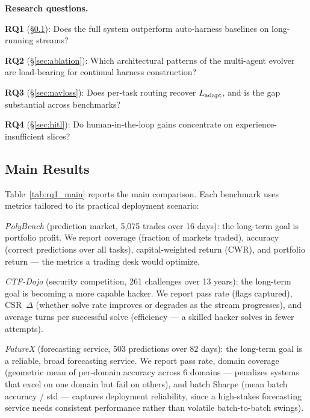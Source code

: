 \noindent\textbf{Research questions.}

\begin{compactenum}[$\bullet$]
\item \textbf{RQ1} (\S\ref{sec:main-results}): Does the full system outperform auto-harness baselines on long-running streams?
\item \textbf{RQ2} (\S\ref{sec:ablation}): Which architectural patterns of the multi-agent evolver are load-bearing for continual harness construction?
\item \textbf{RQ3} (\S\ref{sec:navloss}): Does per-task routing recover $L_{\text{adapt}}$, and is the gap substantial across benchmarks?
\item \textbf{RQ4} (\S\ref{sec:hitl}): Do human-in-the-loop gains concentrate on experience-insufficient slices?
\end{compactenum}

\subsection{Main Results}
\label{sec:main-results}

Table~\ref{tab:rq1_main} reports the main comparison. Each benchmark uses metrics tailored to its practical deployment scenario:

\begin{compactenum}[(i)]
\item \emph{PolyBench} (prediction market, 5{,}075 trades over 16 days): the long-term goal is portfolio profit. We report coverage (fraction of markets traded), accuracy (correct predictions over all tasks), capital-weighted return (CWR), and portfolio return --- the metrics a trading desk would optimize.
\item \emph{CTF-Dojo} (security competition, 261 challenges over 13 years): the long-term goal is becoming a more capable hacker. We report pass rate (flags captured), CSR~$\Delta$ (whether solve rate improves or degrades as the stream progresses), and average turns per successful solve (efficiency --- a skilled hacker solves in fewer attempts).
\item \emph{FutureX} (forecasting service, 503 predictions over 82 days): the long-term goal is a reliable, broad forecasting service. We report pass rate, domain coverage (geometric mean of per-domain accuracy across 6 domains --- penalizes systems that excel on one domain but fail on others), and batch Sharpe (mean batch accuracy / std --- captures deployment reliability, since a high-stakes forecasting service needs consistent performance rather than volatile batch-to-batch swings).
\end{compactenum}

